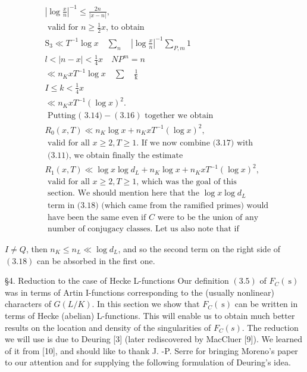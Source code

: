 $$
\begin{aligned}
& \left|\log \frac{x}{n}\right|^{-1} \leqslant \frac{2 n}{|x-n|}, \\
& \text { valid for } n \geqslant \frac{1}{2} x \text {, to obtain } \\
& \mathrm{S}_{3} \ll T^{-1} \log x \quad \sum_{n} \quad\left|\log \frac{x}{n}\right|^{-1} \sum_{P, m} 1 \\
& l<|n-x|<\frac{1}{4} x \quad N P^{m}=n \\
& \ll n_{K} x T^{-1} \log x \quad \sum \quad \frac{1}{\mathrm{k}} \\
& I \leqslant k<\frac{1}{4} x \\
& \ll n_{K} x T^{-1}(\log x)^{2} . \\
& \text { Putting ( } 3.14)-(3.16) \text { together we obtain } \\
& R_{0}(x, T) \ll n_{K} \log x+n_{K} x T^{-1}(\log x)^{2}, \\
& \text { valid for all } x \geqslant 2, T \geqslant 1 \text {. If we now combine (3.17) with } \\
& \text { (3.11), we obtain finally the estimate } \\
& R_{1}(x, T) \ll \log x \log d_{L}+n_{K} \log x+n_{K} x T^{-1}(\log x)^{2}, \\
& \text { valid for all } x \geqslant 2, T \geqslant 1 \text {, which was the goal of this } \\
& \text { section. We should mention here that the } \log x \log d_{L} \\
& \text { term in (3.18) (which came from the ramified primes) would } \\
& \text { have been the same even if } C \text { were to be the union of any } \\
& \text { number of conjugacy classes. Let us also note that if } 
\end{aligned}
$$

$I \neq Q$, then $n_{K} \leqslant n_{L} \ll \log d_{L}$, and so the second term on the right side of $(3.18)$ can be absorbed in the first one.

§4. Reduction to the case of Hecke L-functions Our definition $(3.5)$ of $F_{C}(\mathrm{~s})$ was in terms of Artin I-functions corresponding to the (usually nonlinear) characters of $G(L / K)$. In this section we show that $F_{C}(\mathrm{~s})$ can be written in terms of Hecke (abelian) L-functions. This will enable us to obtain much better results on the location and density of the singularities of $F_{C}(s)$. The reduction we will use is due to Deuring [3] (later rediscovered by MacCluer [9]). We learned of it from [10], and should like to thank J. -P. Serre for bringing Moreno's paper to our attention and for supplying the following formulation of Deuring's idea.

